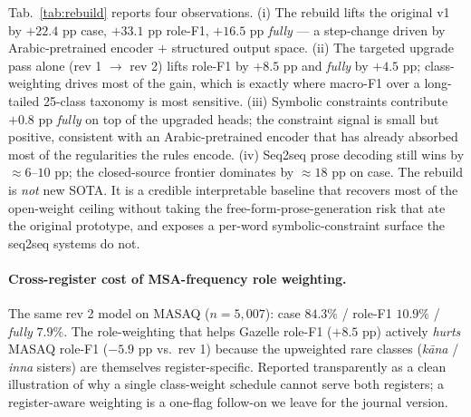 \documentclass[10pt,a4paper,twocolumn]{article}
\begin{document}
Tab.~\ref{tab:rebuild} reports four observations. (i) The rebuild lifts the original v1 by $+22.4$ pp case, $+33.1$ pp role-F1, $+16.5$ pp \emph{fully} --- a step-change driven by Arabic-pretrained encoder $+$ structured output space. (ii) The targeted upgrade pass alone (rev 1 $\rightarrow$ rev 2) lifts role-F1 by $+8.5$ pp and \emph{fully} by $+4.5$ pp; class-weighting drives most of the gain, which is exactly where macro-F1 over a long-tailed 25-class taxonomy is most sensitive. (iii) Symbolic constraints contribute $+0.8$ pp \emph{fully} on top of the upgraded heads; the constraint signal is small but positive, consistent with an Arabic-pretrained encoder that has already absorbed most of the regularities the rules encode. (iv) Seq2seq prose decoding still wins by $\approx 6$--$10$ pp; the closed-source frontier dominates by $\approx 18$ pp on case. The rebuild is \emph{not} new SOTA. It is a credible interpretable baseline that recovers most of the open-weight ceiling without taking the free-form-prose-generation risk that ate the original prototype, and exposes a per-word symbolic-constraint surface the seq2seq systems do not.

\paragraph{Cross-register cost of MSA-frequency role weighting.} The same rev 2 model on MASAQ ($n{=}5{,}007$): case $84.3\%$ / role-F1 $10.9\%$ / \emph{fully} $7.9\%$. The role-weighting that helps Gazelle role-F1 ($+8.5$ pp) actively \emph{hurts} MASAQ role-F1 ($-5.9$ pp vs.\ rev 1) because the upweighted rare classes (\emph{k\=ana} / \emph{inna} sisters) are themselves register-specific. Reported transparently as a clean illustration of why a single class-weight schedule cannot serve both registers; a register-aware weighting is a one-flag follow-on we leave for the journal version.
\end{document}

